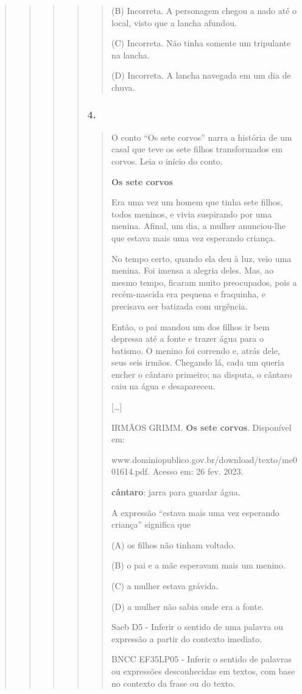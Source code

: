\begin{quote}
\begin{quote}
\begin{quote}
\begin{quote}
\begin{quote}
(B) Incorreta. A personagem chegou a nado até o local, visto que a
lancha afundou.

(C) Incorreta. Não tinha somente um tripulante na lancha.

(D) Incorreta. A lancha navegada em um dia de chuva.
\end{quote}

\subsubsection{4. }\label{section-83}

\begin{quote}
O conto ``Os sete corvos'' narra a história de um casal que teve os sete
filhos transformados em corvos. Leia o início do conto.

\textbf{Os sete corvos}

Era uma vez um homem que tinha sete filhos, todos meninos, e vivia
suspirando por uma menina. Afinal, um dia, a mulher anunciou-lhe que
estava mais uma vez esperando criança.

No tempo certo, quando ela deu à luz, veio uma menina. Foi imensa a
alegria deles. Mas, ao mesmo tempo, ficaram muito preocupados, pois a
recém-nascida era pequena e fraquinha, e precisava ser batizada com
urgência.

Então, o pai mandou um dos filhos ir bem depressa até a fonte e trazer
água para o batismo. O menino foi correndo e, atrás dele, seus seis
irmãos. Chegando lá, cada um queria encher o cântaro primeiro; na
disputa, o cântaro caiu na água e desapareceu.

{[}\ldots{}{]}

IRMÃOS GRIMM. \textbf{Os sete corvos}. Disponível em:

www.dominiopublico.gov.br/download/texto/me001614.pdf. Acesso em: 26
fev. 2023.

\textbf{cântaro}: jarra para guardar água.

A expressão ``estava mais uma vez esperando criança'' significa que

(A) os filhos não tinham voltado.

(B) o pai e a mãe esperavam mais um menino.

(C) a mulher estava grávida.

(D) a mulher não sabia onde era a fonte.

Saeb D5 - Inferir o sentido de uma palavra ou expressão a partir do
contexto imediato.

BNCC EF35LP05 - Inferir o sentido de palavras ou expressões
desconhecidas em textos, com base no contexto da frase ou do texto.


\end{quote}
\end{quote}
\end{quote}
\end{quote}
\end{quote}
